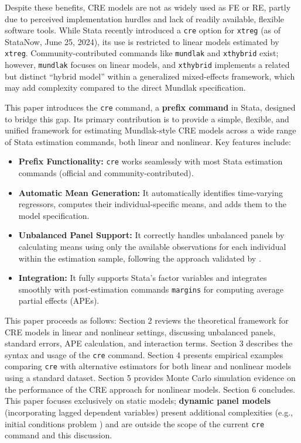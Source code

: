 \documentclass[bib]{statapress}
\providecommand{\tightlist}{%
  \setlength{\itemsep}{0pt}\setlength{\parskip}{0pt}}\usepackage{longtable,booktabs,array}
\begin{document}
Despite these benefits, CRE models are not as widely used as FE or RE,
partly due to perceived implementation hurdles and lack of readily
available, flexible software tools. While Stata recently introduced a
\texttt{cre} option for \texttt{xtreg} (as of StataNow, June 25, 2024),
its use is restricted to linear models estimated by \texttt{xtreg}.
Community-contributed commands like \texttt{mundlak} \citep{perales2013}
and \texttt{xthybrid} \citep{schunck2017} exist; however,
\texttt{mundlak} focuses on linear models, and \texttt{xthybrid}
implements a related but distinct ``hybrid model'' within a generalized
mixed-effects framework, which may add complexity compared to the direct
Mundlak specification.

This paper introduces the \texttt{cre} command, a \textbf{prefix
command} in Stata, designed to bridge this gap. Its primary contribution
is to provide a simple, flexible, and unified framework for estimating
Mundlak-style CRE models across a wide range of Stata estimation
commands, both linear and nonlinear. Key features include:

\begin{itemize}
\tightlist
\item
  \textbf{Prefix Functionality:} \texttt{cre} works seamlessly with most
  Stata estimation commands (official and community-contributed).
\item
  \textbf{Automatic Mean Generation:} It automatically identifies
  time-varying regressors, computes their individual-specific means, and
  adds them to the model specification.
\item
  \textbf{Unbalanced Panel Support:} It correctly handles unbalanced
  panels by calculating means using only the available observations for
  each individual within the estimation sample, following the approach
  validated by \citet[see specific discussion in Section
  2.1]{wooldridge2019}.
\item
  \textbf{Integration:} It fully supports Stata's factor variables and
  integrates smoothly with post-estimation commands \texttt{margins} for
  computing average partial effects (APEs).
\end{itemize}

This paper proceeds as follows: Section 2 reviews the theoretical
framework for CRE models in linear and nonlinear settings, discussing
unbalanced panels, standard errors, APE calculation, and interaction
terms. Section 3 describes the syntax and usage of the \texttt{cre}
command. Section 4 presents empirical examples comparing \texttt{cre}
with alternative estimators for both linear and nonlinear models using a
standard dataset. Section 5 provides Monte Carlo simulation evidence on
the performance of the CRE approach for nonlinear models. Section 6
concludes. This paper focuses exclusively on static models;
\textbf{dynamic panel models} (incorporating lagged dependent variables)
present additional complexities (e.g., initial conditions problem
\citep{wooldridge2010econometric}) and are outside the scope of the
current \texttt{cre} command and this discussion.
\end{document}
